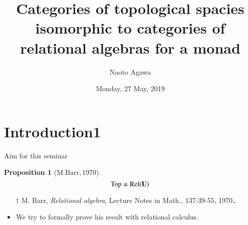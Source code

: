 \documentclass[dvipdfmx,10pt,notheorems]{beamer}
\title{Categories of topological spacies isomorphic to categories of relational algebras for a monad}
\author[Naoto Agawa]
{Naoto Agawa}
\institute[Kyushu Univ., Math Dept.
]{\url{}\\%
}
\date{Monday, 27 May, 2019}
\newtheorem{proposition}[theorem]{Proposition}
\renewcommand{\#}{^\sharp}
\begin{document}
\begin{frame}\frametitle{}
  \titlepage
\end{frame}

\begin{frame}\frametitle{}
  \tableofcontents
\end{frame}




\section{Introduction1}
	\begin{frame}{Aim for this seminar}
		\begin{proposition}[$\mathrm{M. Barr},1970$]
				$$ {\rm Top} \cong {\rm Rel(\mathbf{U})} $$
		\end{proposition}
		{\small
			 \begin{itemize}
				\item[$\dagger$]  M. Barr, {\sl Relational algebra}, Lecture Notes in Math., 
				137:39-55, 1970．
			 \end{itemize}
		 }
		\begin{itemize}
			 \item We try to formally prove his result with relational calculus.
		\end{itemize}
	\end{frame}
\end{document}
